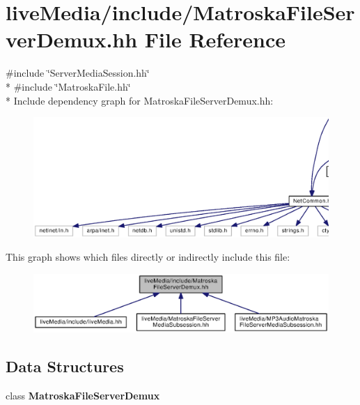 \section{live\+Media/include/\+Matroska\+File\+Server\+Demux.hh File Reference}
\label{MatroskaFileServerDemux_8hh}
{\ttfamily \#include \char`\"{}Server\+Media\+Session.\+hh\char`\"{}}\\*
{\ttfamily \#include \char`\"{}Matroska\+File.\+hh\char`\"{}}\\*
Include dependency graph for Matroska\+File\+Server\+Demux.\+hh\+:
\nopagebreak
\begin{figure}[H]
\begin{center}
\leavevmode
\includegraphics[width=350pt]{MatroskaFileServerDemux_8hh__incl}
\end{center}
\end{figure}
This graph shows which files directly or indirectly include this file\+:
\nopagebreak
\begin{figure}[H]
\begin{center}
\leavevmode
\includegraphics[width=350pt]{MatroskaFileServerDemux_8hh__dep__incl}
\end{center}
\end{figure}
\subsection*{Data Structures}
\begin{DoxyCompactItemize}
\item 
class {\bf Matroska\+File\+Server\+Demux}
\end{DoxyCompactItemize}
